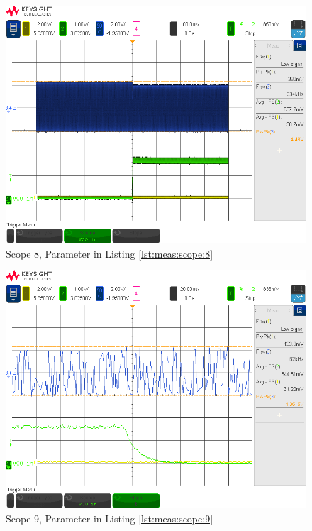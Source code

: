 \begin{figure}[h!tb]
    \centering
    \includegraphics[width=1\textwidth, trim=0mm 21mm 0mm 11mm, clip]{images/scopeShots/scope_8b.png}
    \caption{Scope 8, Parameter in Listing \ref{lst:meas:scope:8}}
    \label{fig:meas:scope:8}
\end{figure}

\begin{figure}[h!tb]
    \centering
    \includegraphics[width=1\textwidth, trim=0mm 21mm 0mm 11mm, clip]{images/scopeShots/scope_9b.png}
    \caption{Scope 9, Parameter in Listing \ref{lst:meas:scope:9}}
    \label{fig:meas:scope:9}
\end{figure}


